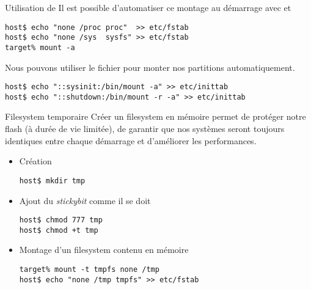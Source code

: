 \begin{frame}[fragile=singleslide]{Utilisation de }
  Il  est   possible  d'automatiser  ce  montage   au  démarrage  avec
   et 
  \begin{lstlisting}
host$ echo "none /proc proc"  >> etc/fstab
host$ echo "none /sys  sysfs" >> etc/fstab
target% mount -a
  \end{lstlisting}

  Nous pouvons utiliser le  fichier  pour monter nos
  partitions automatiquement.
  \begin{lstlisting}
host$ echo "::sysinit:/bin/mount -a" >> etc/inittab
host$ echo "::shutdown:/bin/mount -r -a" >> etc/inittab
  \end{lstlisting}
\end{frame}

\begin{frame}[fragile=singleslide]{Filesystem temporaire}
  Créer un  filesystem en  mémoire permet de  protéger notre  flash (à
  durée  de vie  limitée), de  garantir que  nos systèmes  seront toujours
  identiques entre chaque démarrage et d'améliorer les performances.
  \begin{itemize}
    \item Création
    \begin{lstlisting}
host$ mkdir tmp
    \end{lstlisting}
  \item Ajout du \emph{stickybit} comme il se doit
    \begin{lstlisting}
host$ chmod 777 tmp
host$ chmod +t tmp
    \end{lstlisting}
  \item Montage d'un filesystem contenu en mémoire
    \begin{lstlisting}
target% mount -t tmpfs none /tmp
host$ echo "none /tmp tmpfs" >> etc/fstab
    \end{lstlisting}
  \end{itemize}
\end{frame}

